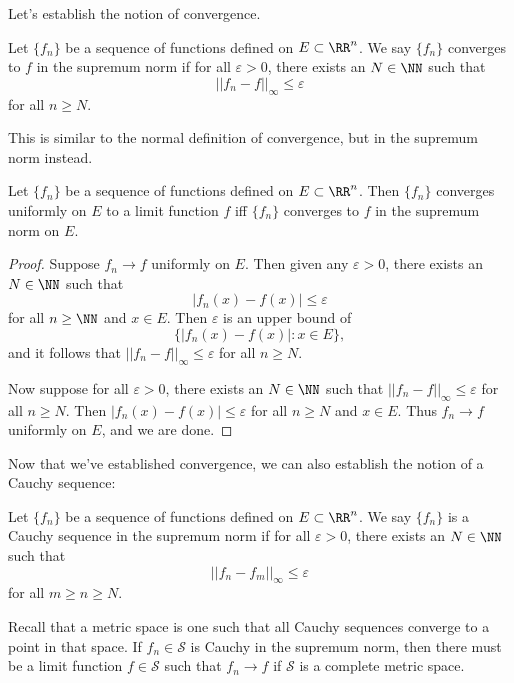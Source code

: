 Let's establish the notion of convergence. 
\begin{definition}
Let $\{f_n\}$ be a sequence of functions defined on $E \subset \RR^n$. We say $\{f_n\}$ converges to $f$ in the supremum norm if for all $\varepsilon > 0$, there exists an $N \in \NN$ such that 
\[ ||f_n - f||_\infty \leq \varepsilon \] for all $n \geq N$. 
\end{definition}
This is similar to the normal definition of convergence, but in the supremum norm instead. 
\begin{theorem}
Let $\{f_n\}$ be a sequence of functions defined on $E \subset \RR^n$. Then $\{f_n\}$ converges uniformly on $E$ to a limit function $f$ iff $\{f_n\}$ converges to $f$ in the supremum norm on $E$. 
\end{theorem}
\begin{proof}
Suppose $f_n\to f$ uniformly on $E$. Then given any $\varepsilon > 0$, there exists an $N \in \NN$ such that 
\[ |f_n(x) - f(x)| \leq \varepsilon \] for all $n \geq \NN$ and $x \in E$. Then $\varepsilon$ is an upper bound of
\[ \{|f_n(x) - f(x)| : x \in E \}, \] and it follows that $||f_n - f||_\infty \leq \varepsilon$ for all $n \geq N$. 

Now suppose for all $\varepsilon > 0$, there exists an $N \in \NN$ such that $||f_n - f||_\infty \leq \varepsilon$ for all $n \geq N$. Then $|f_n(x) - f(x)| \leq \varepsilon$ for all $n \geq N$ and $x \in E$. Thus $f_n \to f$ uniformly on $E$, and we are done. 
\end{proof}

Now that we've established convergence, we can also establish the notion of a Cauchy sequence:
\begin{definition}
Let $\{f_n\}$ be a sequence of functions defined on $E \subset \RR^n$. We say $\{f_n\}$ is a Cauchy sequence in the supremum norm if for all $\varepsilon > 0$, there exists an $N \in \NN$ such that 
\[ ||f_n - f_m||_\infty \leq \varepsilon\] for all $m \geq n \geq N$. 
\end{definition}

Recall that a  metric space is one such that all Cauchy sequences converge to a point in that space. 
If $f_n \in \mathcal{S}$ is Cauchy in the supremum norm, then there must be a limit function $f \in \mathcal{S}$ such that $f_n \to f$ if $\mathcal{S}$ is a complete metric space. 

